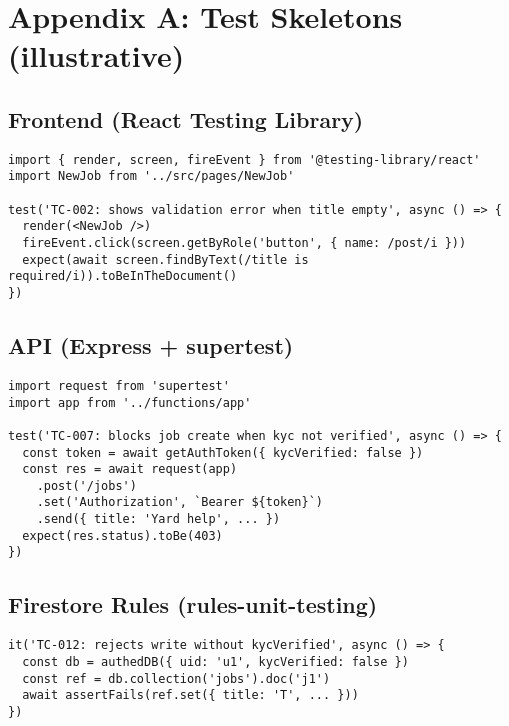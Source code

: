 \documentclass[11pt]{article}
\begin{document}
\section*{Appendix A: Test Skeletons (illustrative)}
\subsection*{Frontend (React Testing Library)}
\begin{lstlisting}
import { render, screen, fireEvent } from '@testing-library/react'
import NewJob from '../src/pages/NewJob'

test('TC-002: shows validation error when title empty', async () => {
  render(<NewJob />)
  fireEvent.click(screen.getByRole('button', { name: /post/i }))
  expect(await screen.findByText(/title is required/i)).toBeInTheDocument()
})
\end{lstlisting}

\subsection*{API (Express + supertest)}
\begin{lstlisting}
import request from 'supertest'
import app from '../functions/app'

test('TC-007: blocks job create when kyc not verified', async () => {
  const token = await getAuthToken({ kycVerified: false })
  const res = await request(app)
    .post('/jobs')
    .set('Authorization', `Bearer ${token}`)
    .send({ title: 'Yard help', ... })
  expect(res.status).toBe(403)
})
\end{lstlisting}

\subsection*{Firestore Rules (rules-unit-testing)}
\begin{lstlisting}
it('TC-012: rejects write without kycVerified', async () => {
  const db = authedDB({ uid: 'u1', kycVerified: false })
  const ref = db.collection('jobs').doc('j1')
  await assertFails(ref.set({ title: 'T', ... }))
})
\end{lstlisting}
\end{document}
